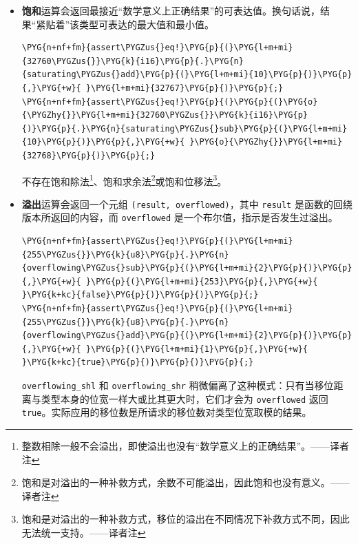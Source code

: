 \begin{itemize}
\item \textbf{饱和}运算会返回最接近“数学意义上正确结果”的可表达值。换句话说，结果“紧贴着”该类型可表达的最大值和最小值。

\begin{Verbatim}[commandchars=\\\{\},breaklines=true,breakanywhere=true,fontsize=\codefont,xleftmargin=17bp]
\PYG{n+nf+fm}{assert\PYGZus{}eq!}\PYG{p}{(}\PYG{l+m+mi}{32760\PYGZus{}}\PYG{k}{i16}\PYG{p}{.}\PYG{n}{saturating\PYGZus{}add}\PYG{p}{(}\PYG{l+m+mi}{10}\PYG{p}{)}\PYG{p}{,}\PYG{+w}{ }\PYG{l+m+mi}{32767}\PYG{p}{)}\PYG{p}{;}
\PYG{n+nf+fm}{assert\PYGZus{}eq!}\PYG{p}{(}\PYG{p}{(}\PYG{o}{\PYGZhy{}}\PYG{l+m+mi}{32760\PYGZus{}}\PYG{k}{i16}\PYG{p}{)}\PYG{p}{.}\PYG{n}{saturating\PYGZus{}sub}\PYG{p}{(}\PYG{l+m+mi}{10}\PYG{p}{)}\PYG{p}{,}\PYG{+w}{ }\PYG{o}{\PYGZhy{}}\PYG{l+m+mi}{32768}\PYG{p}{)}\PYG{p}{;}
\end{Verbatim}

不存在饱和除法\footnote{整数相除一般不会溢出，即使溢出也没有“数学意义上的正确结果”。——译者注}、饱和求余法\footnote{饱和是对溢出的一种补救方式，余数不可能溢出，因此饱和也没有意义。——译者注}或饱和位移法\footnote{饱和是对溢出的一种补救方式，移位的溢出在不同情况下补救方式不同，因此无法统一支持。——译者注}。
\item \textbf{溢出}运算会返回一个元组 \texttt{(result, overflowed)}，其中 \texttt{result} 是函数的回绕版本所返回的内容，而 \texttt{overflowed} 是一个布尔值，指示是否发生过溢出。

\begin{Verbatim}[commandchars=\\\{\},breaklines=true,breakanywhere=true,fontsize=\codefont,xleftmargin=17bp]
\PYG{n+nf+fm}{assert\PYGZus{}eq!}\PYG{p}{(}\PYG{l+m+mi}{255\PYGZus{}}\PYG{k}{u8}\PYG{p}{.}\PYG{n}{overflowing\PYGZus{}sub}\PYG{p}{(}\PYG{l+m+mi}{2}\PYG{p}{)}\PYG{p}{,}\PYG{+w}{ }\PYG{p}{(}\PYG{l+m+mi}{253}\PYG{p}{,}\PYG{+w}{ }\PYG{k+kc}{false}\PYG{p}{)}\PYG{p}{)}\PYG{p}{;}
\PYG{n+nf+fm}{assert\PYGZus{}eq!}\PYG{p}{(}\PYG{l+m+mi}{255\PYGZus{}}\PYG{k}{u8}\PYG{p}{.}\PYG{n}{overflowing\PYGZus{}add}\PYG{p}{(}\PYG{l+m+mi}{2}\PYG{p}{)}\PYG{p}{,}\PYG{+w}{ }\PYG{p}{(}\PYG{l+m+mi}{1}\PYG{p}{,}\PYG{+w}{ }\PYG{k+kc}{true}\PYG{p}{)}\PYG{p}{)}\PYG{p}{;}
\end{Verbatim}

\texttt{overflowing\_shl} 和 \texttt{overflowing\_shr} 稍微偏离了这种模式：只有当移位距离与类型本身的位宽一样大或比其更大时，它们才会为 \texttt{overflowed} 返回 \texttt{true}。实际应用的移位数是所请求的移位数对类型位宽取模的结果。


\end{itemize}
